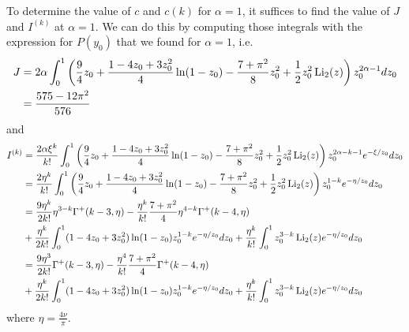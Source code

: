 To determine the value of $c$ and $c(k)$ for $\alpha=1$, it suffices to find the value of $J$ and $I^{(k)}$ at $\alpha = 1$. 
We can do this by computing those integrals with the expression for $P(y_0)$ that we found for $\alpha=1$, i.e.
\begin{align*}
J &= 2\alpha\int_0^1 \left(\frac{9}{4} z_0 + \frac{1 - 4 z_0 + 3 z_0^2}{4}\ln(1 - z_0) - \frac{7+\pi^2}{8}
z_0^2  + 
\frac{1}{2}z_0^2 \operatorname{Li}_2(z)\right) z_0^{2\alpha -1} dz_0 \\
&=\frac{575-12\pi^2}{576}
\end{align*}
and 
\begin{align*}
I^{(k)} &= \frac{2\alpha \xi^k}{k!}\int_0^1 \left(\frac{9}{4} z_0 + \frac{1 - 4 z_0 + 3 z_0^2}{4}\ln(1 - z_0) - \frac{7+\pi^2}{8}
z_0^2  + 
\frac{1}{2}z_0^2 \operatorname{Li}_2(z) \right)z_0^{2\alpha-k-1} e^{-\xi/z_0} dz_0 \\
&= \frac{2 \eta^k}{k!}\int_0^1 \left(\frac{9}{4} z_0 + \frac{1 - 4 z_0 + 3 z_0^2}{4}\ln(1 - z_0) - \frac{7+\pi^2}{8}
z_0^2  + 
\frac{1}{2}z_0^2 \operatorname{Li}_2(z) \right)z_0^{1-k} e^{-\eta/z_0} dz_0 \\
&= \frac{9 \eta^k}{2 k!}\eta^{3-k}\Gamma^+(k-3,\eta)-\frac{\eta^k}{k!}\frac{7+\pi^2}{4}\eta^{4-k}\Gamma^+(k-4,\eta)\\
&+\frac{\eta^k}{2k!}\int_0^1 (1-4z_0+3z_0^2)\ln(1-z_0)z_0^{1-k}e^{-\eta/z_0}dz_0+\frac{\eta^k}{k!}\int_0^1 z_0^{3-k} \operatorname{Li}_2(z) e^{-\eta/z_0}dz_0 \\
&=\frac{9 \eta^3}{2 k!}\Gamma^+(k-3,\eta)-\frac{\eta^4}{k!}\frac{7+\pi^2}{4}\Gamma^+(k-4,\eta)\\
&+\frac{\eta^k}{2k!}\int_0^1 (1-4z_0+3z_0^2)\ln(1-z_0)z_0^{1-k}e^{-\eta/z_0}dz_0+\frac{\eta^k}{k!}\int_0^1 z_0^{3-k} \operatorname{Li}_2(z) e^{-\eta/z_0}dz_0
\end{align*}
where $\eta = \frac{4\nu}{\pi}$.

